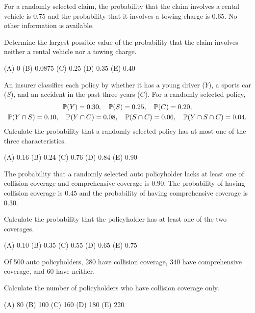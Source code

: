 \begin{practice}
For a randomly selected claim, the probability that the claim involves a rental
vehicle is $0.75$ and the probability that it involves a towing charge is $0.65$.
No other information is available.

Determine the largest possible value of the probability that the claim involves
neither a rental vehicle nor a towing charge.

(A) 0 \quad (B) 0.0875 \quad (C) 0.25 \quad (D) 0.35 \quad (E) 0.40
\end{practice}

\begin{practice}
An insurer classifies each policy by whether it has a young driver ($Y$), a
sports car ($S$), and an accident in the past three years ($C$). For a randomly
selected policy,
\begin{gather*}
  \mathbb{P}(Y) = 0.30,\quad \mathbb{P}(S) = 0.25,\quad \mathbb{P}(C) = 0.20,\\
  \mathbb{P}(Y\cap S) = 0.10,\quad \mathbb{P}(Y \cap C) = 0.08,\quad \mathbb{P}(S \cap C) = 0.06,\quad
  \mathbb{P}(Y \cap S \cap C) = 0.04 .
\end{gather*}
Calculate the probability that a randomly selected policy has at most one of the
three characteristics.

(A) 0.16 \quad (B) 0.24 \quad (C) 0.76 \quad (D) 0.84 \quad (E) 0.90
\end{practice}

\begin{practice}
The probability that a randomly selected auto policyholder lacks at least one of
collision coverage and comprehensive coverage is $0.90$. The probability of having
collision coverage is $0.45$ and the probability of having comprehensive coverage
is $0.30$.

Calculate the probability that the policyholder has at least one of the two
coverages.

(A) 0.10 \quad (B) 0.35 \quad (C) 0.55 \quad (D) 0.65 \quad (E) 0.75
\end{practice}

\begin{practice}
Of 500 auto policyholders, 280 have collision coverage, 340 have comprehensive
coverage, and 60 have neither.

Calculate the number of policyholders who have collision coverage only.

(A) 80 \quad (B) 100 \quad (C) 160 \quad (D) 180 \quad (E) 220
\end{practice}

